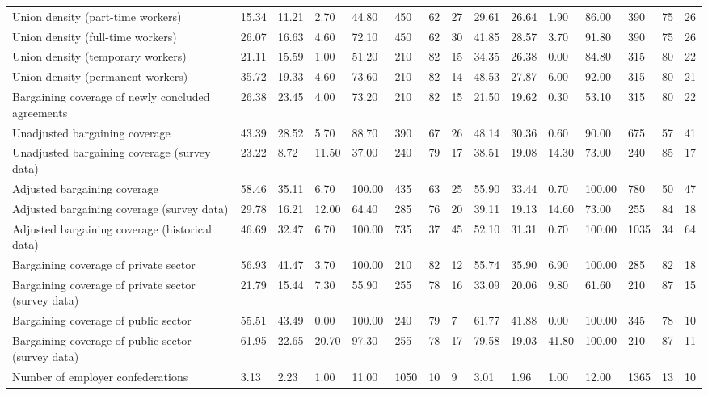 \begin{longtable}{lllllllllllllll}
Union density (part-time workers) & 15.34 & 11.21 & 2.70 & 44.80 & 450 & 62 & 27 & 29.61 & 26.64 & 1.90 & 86.00 & 390 & 75 & 26\\
Union density (full-time workers) & 26.07 & 16.63 & 4.60 & 72.10 & 450 & 62 & 30 & 41.85 & 28.57 & 3.70 & 91.80 & 390 & 75 & 26\\
Union density (temporary workers) & 21.11 & 15.59 & 1.00 & 51.20 & 210 & 82 & 15 & 34.35 & 26.38 & 0.00 & 84.80 & 315 & 80 & 22\\
Union density (permanent workers) & 35.72 & 19.33 & 4.60 & 73.60 & 210 & 82 & 14 & 48.53 & 27.87 & 6.00 & 92.00 & 315 & 80 & 21\\
\addlinespace
Bargaining coverage of newly concluded agreements & 26.38 & 23.45 & 4.00 & 73.20 & 210 & 82 & 15 & 21.50 & 19.62 & 0.30 & 53.10 & 315 & 80 & 22\\
Unadjusted bargaining coverage & 43.39 & 28.52 & 5.70 & 88.70 & 390 & 67 & 26 & 48.14 & 30.36 & 0.60 & 90.00 & 675 & 57 & 41\\
Unadjusted bargaining coverage (survey data) & 23.22 & 8.72 & 11.50 & 37.00 & 240 & 79 & 17 & 38.51 & 19.08 & 14.30 & 73.00 & 240 & 85 & 17\\
Adjusted bargaining coverage & 58.46 & 35.11 & 6.70 & 100.00 & 435 & 63 & 25 & 55.90 & 33.44 & 0.70 & 100.00 & 780 & 50 & 47\\
Adjusted bargaining coverage (survey data) & 29.78 & 16.21 & 12.00 & 64.40 & 285 & 76 & 20 & 39.11 & 19.13 & 14.60 & 73.00 & 255 & 84 & 18\\
\addlinespace
Adjusted bargaining coverage (historical data) & 46.69 & 32.47 & 6.70 & 100.00 & 735 & 37 & 45 & 52.10 & 31.31 & 0.70 & 100.00 & 1035 & 34 & 64\\
Bargaining coverage of private sector & 56.93 & 41.47 & 3.70 & 100.00 & 210 & 82 & 12 & 55.74 & 35.90 & 6.90 & 100.00 & 285 & 82 & 18\\
Bargaining coverage of private sector (survey data) & 21.79 & 15.44 & 7.30 & 55.90 & 255 & 78 & 16 & 33.09 & 20.06 & 9.80 & 61.60 & 210 & 87 & 15\\
Bargaining coverage of public sector & 55.51 & 43.49 & 0.00 & 100.00 & 240 & 79 & 7 & 61.77 & 41.88 & 0.00 & 100.00 & 345 & 78 & 10\\
Bargaining coverage of public sector (survey data) & 61.95 & 22.65 & 20.70 & 97.30 & 255 & 78 & 17 & 79.58 & 19.03 & 41.80 & 100.00 & 210 & 87 & 11\\
\addlinespace
Number of employer confederations & 3.13 & 2.23 & 1.00 & 11.00 & 1050 & 10 & 9 & 3.01 & 1.96 & 1.00 & 12.00 & 1365 & 13 & 10\\

\end{longtable}
